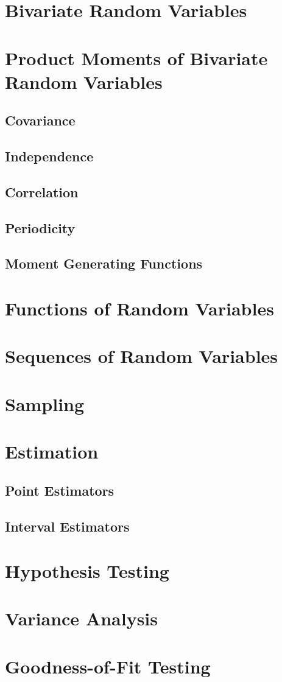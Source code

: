 \documentclass{article}
\begin{document}
\newpage
\section{Bivariate Random Variables}

\section {Product Moments of Bivariate Random Variables}
\subsection{Covariance}
\subsection{Independence}
\subsection{Correlation}
\subsection{Periodicity}
\subsection{Moment Generating Functions}

\newpage
\section{Functions of Random Variables}

\newpage
\section{Sequences of Random Variables}

\newpage
\section{Sampling}

\newpage
\section{Estimation}

\subsection{Point Estimators}
\subsection{Interval Estimators}

\newpage
\section{Hypothesis Testing}

\newpage
\section{Variance Analysis}

\newpage
\section{Goodness-of-Fit Testing}
\end{document}
